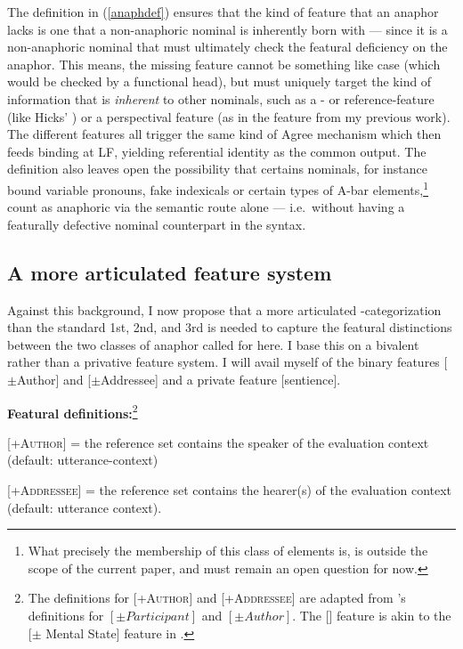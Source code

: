 \documentclass[output=paper, modfonts, nonflat]{langsci/langscibook}
\begin{document}
\noindent The definition in (\ref{anaphdef}) ensures that the kind of feature that an anaphor
lacks is one that a non-anaphoric nominal is inherently born with ---
since it is a non-anaphoric nominal that must ultimately check the
featural deficiency on the anaphor. This means, the missing feature
cannot be something like case (which would be checked by a functional
head), but must uniquely target the kind of information that is
\emph{inherent} to other nominals, such as a \ph- or reference-feature
(like Hicks' \var) or a perspectival feature (as in the \dep{} feature
from my previous work). The different features all trigger the same
kind of Agree mechanism which then feeds binding at LF, yielding
referential identity as the common output. The definition also leaves
open the possibility that certains nominals, for instance bound
variable pronouns, fake indexicals \citep{kratzer:2009} or certain
types of A-bar elements,\footnote{What precisely the membership of
  this class of elements is, is outside the scope of the current
  paper, and must remain an open question for now.}  count as
anaphoric via the semantic route alone --- i.e.\ without having a
featurally defective nominal counterpart in the syntax.


\subsection{A more articulated feature system}

Against this background, I now propose that a more articulated
\person-categorization than the standard 1st, 2nd, and 3rd is needed
to capture the featural distinctions between the two classes of
anaphor called for here. I base this on a bivalent rather than a
privative feature system. I will avail myself of the binary features
[$\pm$Author] and [$\pm$Addressee] and a private feature
[sentience].

\ea\label{def} \textbf{Featural definitions:}\footnote{The definitions
  for \textsc{[+Author]} and \textsc{[+Addressee]} are adapted from
  \citet{halle:1997, nevins:2007}'s definitions for
  $[\pm Participant]$ and $[\pm Author]$. The [\sentience] feature is
  akin to the [$\pm$ Mental State] feature in \citet{reinhart:2000}.}

\ea \textsc{[+Author]} = the reference set contains the speaker of the
evaluation context (default: utterance-context)

\ex \textsc{[+Addressee]} = the reference set contains the hearer(s)
of the evaluation context (default: utterance context).
\end{document}
